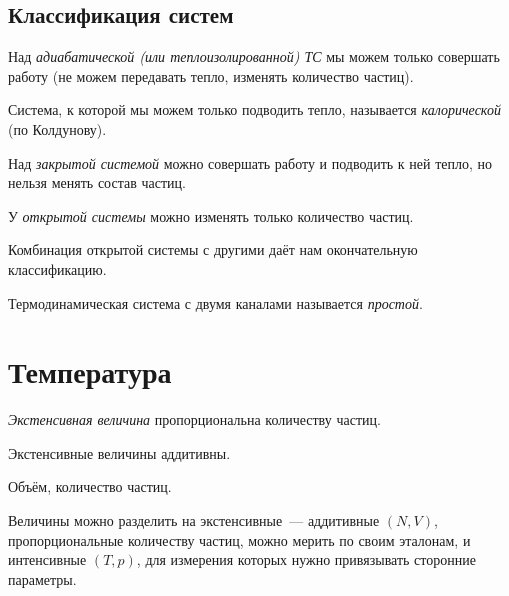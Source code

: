 \documentclass[../main.tex]{subfiles}
\begin{document}
    \subsection{Классификация систем}
        \begin{definition}
            Над \emph{адиабатической (или теплоизолированной) ТС} мы можем только совершать работу (не можем передавать тепло, изменять количество частиц).
        \end{definition}    
        \begin{definition}
            Система, к которой мы можем только подводить тепло, называется \emph{калорической} (по Колдунову).
        \end{definition}
        \begin{definition}
            Над \emph{закрытой системой} можно совершать работу и подводить к ней тепло, но нельзя менять состав частиц.
        \end{definition}
        \begin{definition}
            У \emph{открытой системы} можно изменять только количество частиц. 
        \end{definition}
        \begin{note}
            Комбинация открытой системы с другими даёт нам окончательную классификацию.
        \end{note}

        \begin{definition}
            Термодинамическая система с двумя каналами называется \emph{простой}.
        \end{definition}
       

        \section{Температура}
        \begin{definition}
            \emph{Экстенсивная величина} пропорциональна количеству частиц.
        \end{definition}
        \begin{note}
            Экстенсивные величины аддитивны.
        \end{note}
        \begin{example}
            Объём, количество частиц.
        \end{example}

    Величины можно разделить на экстенсивные~--- аддитивные $(N, V)$, пропорциональные количеству частиц, можно мерить по своим эталонам,
    и интенсивные $(T, p)$, для измерения которых нужно привязывать сторонние параметры.
\end{document}
